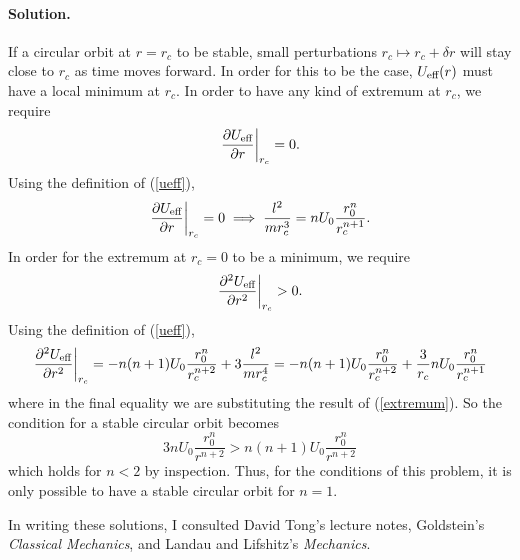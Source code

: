 \documentclass[11pt]{article}
\newcommand{\pder}[2]{\frac{\partial#1}{\partial#2}}
\newcommand{\pdder}[2]{\frac{\partial^2 #1}{\partial #2^2}}
\newcommand{\refeq}[1]{(\ref{#1})}
\newenvironment{solution}
{
    \paragraph{Solution.}
    \ignorespaces
}
{
    \bigskip\bigskip
}
\begin{document}
\begin{enumerate}
\begin{solution}
		If a circular orbit at $r = r_c$ to be stable, small perturbations $r_c \mapsto r_c + \delta r$ will stay close to $r_c$ as time moves forward.  In order for this to be the case, $U_\text{eff}(r)$ must have a local minimum at $r_c$. In order to have any kind of extremum at $r_c$, we require
		\begin{equation}
			\left. \pder{\Ueff}{r} \right|_{r_c} = 0.
		\end{equation}
		Using the definition of \refeq{ueff},
		\begin{equation} \label{extremum}
			\left. \pder{\Ueff}{r} \right|_{r_c} = 0 \implies \frac{l^2}{m r_c^3} = n U_0 \frac{r_0^n}{r_c^{n+1}}.
		\end{equation}
		In order for the extremum at $r_c = 0$ to be a minimum, we require
		\begin{equation}
			\left. \pdder{\Ueff}{r} \right|_{r_c} > 0.
		\end{equation}
		Using the definition of \refeq{ueff},
		\begin{equation} \label{minimum}
			\left. \pdder{\Ueff}{r} \right|_{r_c} = -n (n+1) U_0 \frac{r_0^n}{r_c^{n+2}} + 3 \frac{l^2}{m r_c^4} = -n (n+1) U_0 \frac{r_0^n}{r_c^{n+2}} + \frac{3}{r_c} n U_0 \frac{r_0^n}{r_c^{n+1}}
		\end{equation}
		where in the final equality we are substituting the result of \refeq{extremum}.  So the condition for a stable circular orbit becomes
		\begin{equation}
			3 n U_0 \frac{r_0^n}{r^{n+2}} > n (n + 1) U_0 \frac{r_0^n}{r^{n+2}}
		\end{equation}
		which holds for $n < 2$ by inspection.  Thus, for the conditions of this problem, it is only possible to have a stable circular orbit for $n = 1$.
			
	\end{solution}

\end{enumerate}

In writing these solutions, I consulted David Tong's lecture notes, Goldstein's \emph{Classical Mechanics}, and Landau and Lifshitz's \emph{Mechanics}.
\end{document}
